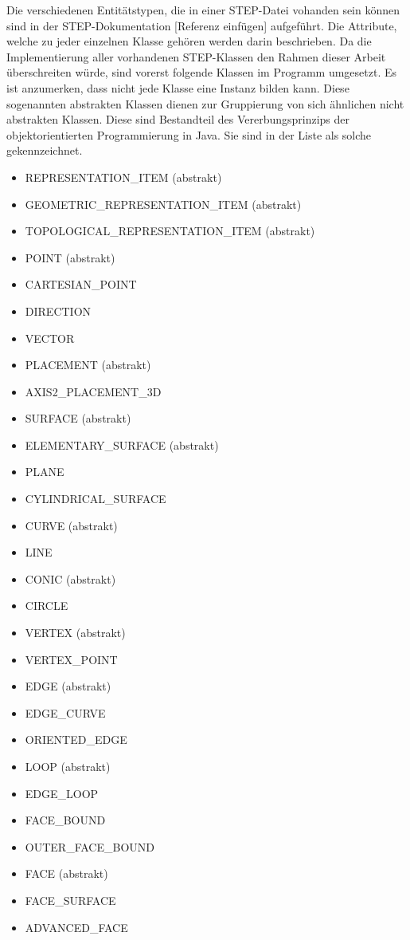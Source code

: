 Die verschiedenen Entitätstypen, die in einer STEP-Datei vohanden sein können sind in der STEP-Dokumentation [Referenz einfügen] aufgeführt. Die Attribute, welche zu jeder einzelnen Klasse gehören werden darin beschrieben.
Da die Implementierung aller vorhandenen STEP-Klassen den Rahmen dieser Arbeit überschreiten würde, sind vorerst folgende Klassen im Programm umgesetzt. Es ist anzumerken, dass nicht jede Klasse eine Instanz bilden kann. Diese sogenannten abstrakten Klassen dienen zur Gruppierung von sich ähnlichen nicht abstrakten Klassen. Diese sind Bestandteil des Vererbungsprinzips der objektorientierten Programmierung in Java. Sie sind in der Liste als solche gekennzeichnet.  
\begin{itemize}
	\item REPRESENTATION\_ITEM (abstrakt)
	\item GEOMETRIC\_REPRESENTATION\_ITEM (abstrakt)
	\item TOPOLOGICAL\_REPRESENTATION\_ITEM (abstrakt)
	\item POINT (abstrakt)
	\item CARTESIAN\_POINT
	\item DIRECTION
	\item VECTOR
	\item PLACEMENT (abstrakt)
	\item AXIS2\_PLACEMENT\_3D
	\item SURFACE (abstrakt)
	\item ELEMENTARY\_SURFACE (abstrakt)
	\item PLANE
	\item CYLINDRICAL\_SURFACE	
	\item CURVE (abstrakt)
	\item LINE
	\item CONIC (abstrakt)
	\item CIRCLE 
	\item VERTEX (abstrakt)
	\item VERTEX\_POINT
	\item EDGE (abstrakt)
	\item EDGE\_CURVE
	\item ORIENTED\_EDGE
	\item LOOP (abstrakt)
	\item EDGE\_LOOP
	\item FACE\_BOUND
	\item OUTER\_FACE\_BOUND
	\item FACE (abstrakt)
	\item FACE\_SURFACE
	\item ADVANCED\_FACE
\end{itemize}

